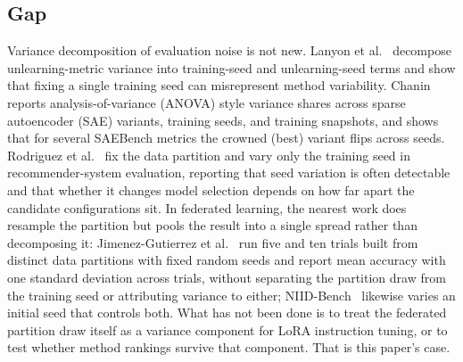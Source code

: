 \subsection{Gap}
Variance decomposition of evaluation noise is not new. Lanyon et al.~\cite{lanyon2025unlearningseeds} decompose unlearning-metric variance into training-seed and unlearning-seed terms and show that fixing a single training seed can misrepresent method variability. Chanin~\cite{chanin2026saebench} reports analysis-of-variance (ANOVA) style variance shares across sparse autoencoder (SAE) variants, training seeds, and training snapshots, and shows that for several SAEBench metrics the crowned (best) variant flips across seeds. Rodriguez et al.~\cite{rodriguez2026recseeds} fix the data partition and vary only the training seed in recommender-system evaluation, reporting that seed variation is often detectable and that whether it changes model selection depends on how far apart the candidate configurations sit. In federated learning, the nearest work does resample the partition but pools the result into a single spread rather than decomposing it: Jimenez-Gutierrez et al.~\cite{jimenez2025thorough} run five and ten trials built from distinct data partitions with fixed random seeds and report mean accuracy with one standard deviation across trials, without separating the partition draw from the training seed or attributing variance to either; NIID-Bench~\cite{li2022niidbench} likewise varies an initial seed that controls both. What has not been done is to treat the federated partition draw itself as a variance component for LoRA instruction tuning, or to test whether method rankings survive that component. That is this paper's case.

